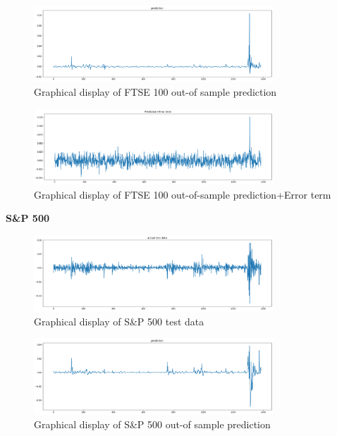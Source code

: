 \documentclass[a4paper,11pt,oneside]{book}
\begin{document}
\begin{figure}[!h]
	\centering
	\includegraphics[width=0.8\textwidth]{figures/FTSEPRED}
	\caption{Graphical display of FTSE 100 out-of sample prediction}
	\label{FTSEPRED}
\end{figure}


\begin{figure}[!h]
	\centering
	\includegraphics[width=0.8\textwidth]{figures/FTSEERROR}
	\caption{Graphical display of FTSE 100 out-of-sample prediction+Error term}
	\label{FTSEERROR}
\end{figure}


\newpage
\textbf{S\&P 500}

\begin{figure}[!h]
	\centering
	\includegraphics[width=0.8\textwidth]{figures/sanptest}
	\caption{Graphical display of S\&P 500 test data}
	\label{sanptest}
\end{figure}

\begin{figure}[!h]
	\centering
	\includegraphics[width=0.8\textwidth]{figures/sanppred}
	\caption{Graphical display of S\&P 500 out-of sample prediction}
	\label{sanpred}
\end{figure}
\end{document}
